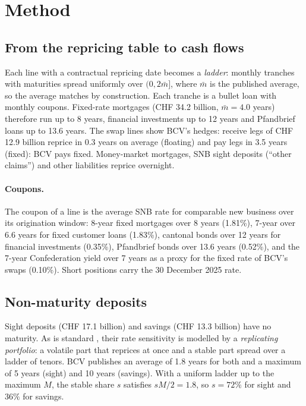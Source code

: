 \documentclass[11pt,a4paper]{article}
\begin{document}
\section{Method}

\subsection{From the repricing table to cash flows}

Each line with a contractual repricing date becomes a \emph{ladder}: monthly tranches with maturities spread uniformly over $(0, 2\bar m]$, where $\bar m$ is the published average, so the average matches by construction. Each tranche is a bullet loan with monthly coupons. Fixed-rate mortgages (CHF 34.2 billion, $\bar m = 4.0$ years) therefore run up to 8 years, financial investments up to 12 years and Pfandbrief loans up to 13.6 years. The swap lines show BCV's hedges: receive legs of CHF 12.9 billion reprice in 0.3 years on average (floating) and pay legs in 3.5 years (fixed): BCV pays fixed. Money-market mortgages, SNB sight deposits (``other claims'') and other liabilities reprice overnight.

\paragraph{Coupons.} The coupon of a line is the average SNB rate for comparable new business over its origination window: 8-year fixed mortgages over 8 years (1.81\%), 7-year over 6.6 years for fixed customer loans (1.83\%), cantonal bonds over 12 years for financial investments (0.35\%), Pfandbrief bonds over 13.6 years (0.52\%), and the 7-year Confederation yield over 7 years as a proxy for the fixed rate of BCV's swaps (0.10\%). Short positions carry the 30 December 2025 rate.

\subsection{Non-maturity deposits}

Sight deposits (CHF 17.1 billion) and savings (CHF 13.3 billion) have no maturity. As is standard \citep{jarrow1998,kalkbrener2004}, their rate sensitivity is modelled by a \emph{replicating portfolio}: a volatile part that reprices at once and a stable part spread over a ladder of tenors. BCV publishes an average of 1.8 years for both and a maximum of 5 years (sight) and 10 years (savings). With a uniform ladder up to the maximum $M$, the stable share $s$ satisfies $s M/2 = 1.8$, so $s = 72\%$ for sight and $36\%$ for savings.
\end{document}
